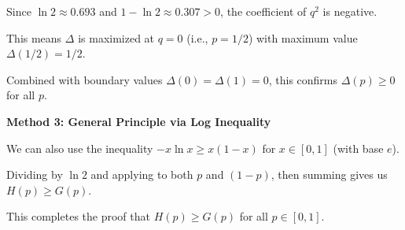 \documentclass[12pt]{article}
\begin{document}
\begin{solution}
Since $\ln 2 \approx 0.693$ and $1 - \ln 2 \approx 0.307 > 0$, the coefficient of $q^2$ is negative.

This means $\Delta$ is maximized at $q = 0$ (i.e., $p = 1/2$) with maximum value $\Delta(1/2) = 1/2$.

Combined with boundary values $\Delta(0) = \Delta(1) = 0$, this confirms $\Delta(p) \geq 0$ for all $p$.

\textbf{Method 3: General Principle via Log Inequality}

We can also use the inequality $-x\ln x \geq x(1-x)$ for $x \in [0,1]$ (with base $e$).

Dividing by $\ln 2$ and applying to both $p$ and $(1-p)$, then summing gives us $H(p) \geq G(p)$.

This completes the proof that $H(p) \geq G(p)$ for all $p \in [0,1]$.
\end{solution}
\end{document}
